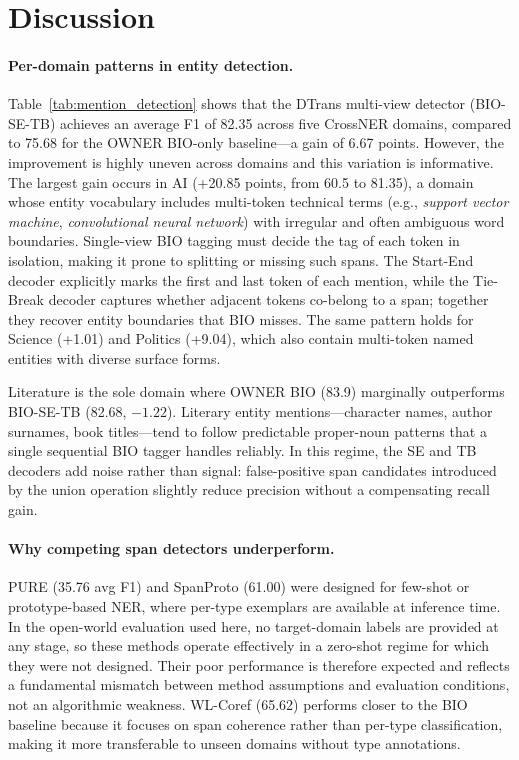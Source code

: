 \documentclass[14pt]{extreport}
\begin{document}
\section{Discussion}\label{sec:discussion}

\paragraph{Per-domain patterns in entity detection.}
Table~\ref{tab:mention_detection} shows that the DTrans multi-view detector (BIO-SE-TB) achieves an average F1 of 82.35 across five CrossNER domains, compared to 75.68 for the OWNER BIO-only baseline---a gain of 6.67 points. However, the improvement is highly uneven across domains and this variation is informative. The largest gain occurs in AI (+20.85 points, from 60.5 to 81.35), a domain whose entity vocabulary includes multi-token technical terms (e.g., \textit{support vector machine}, \textit{convolutional neural network}) with irregular and often ambiguous word boundaries. Single-view BIO tagging must decide the tag of each token in isolation, making it prone to splitting or missing such spans. The Start-End decoder explicitly marks the first and last token of each mention, while the Tie-Break decoder captures whether adjacent tokens co-belong to a span; together they recover entity boundaries that BIO misses. The same pattern holds for Science (+1.01) and Politics (+9.04), which also contain multi-token named entities with diverse surface forms.

Literature is the sole domain where OWNER BIO (83.9) marginally outperforms BIO-SE-TB (82.68, $-1.22$). Literary entity mentions---character names, author surnames, book titles---tend to follow predictable proper-noun patterns that a single sequential BIO tagger handles reliably. In this regime, the SE and TB decoders add noise rather than signal: false-positive span candidates introduced by the union operation slightly reduce precision without a compensating recall gain.

\paragraph{Why competing span detectors underperform.}
PURE (35.76 avg F1) and SpanProto (61.00) were designed for few-shot or prototype-based NER, where per-type exemplars are available at inference time. In the open-world evaluation used here, no target-domain labels are provided at any stage, so these methods operate effectively in a zero-shot regime for which they were not designed. Their poor performance is therefore expected and reflects a fundamental mismatch between method assumptions and evaluation conditions, not an algorithmic weakness. WL-Coref (65.62) performs closer to the BIO baseline because it focuses on span coherence rather than per-type classification, making it more transferable to unseen domains without type annotations.
\end{document}
